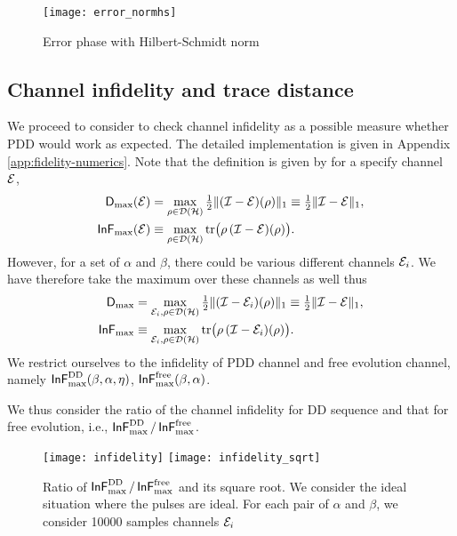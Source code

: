 \documentclass[aps,pra,reprint,superscriptaddress]{revtex4-2}
\begin{document}
\begin{figure}
    \centering
    \texttt{[image: error\_normhs]}
    \caption{Error phase with Hilbert-Schmidt norm} 
    \label{fig:pdd-region-check-norm}
\end{figure}

\subsection{Channel infidelity and trace distance}
We proceed to consider to check channel infidelity as a possible measure whether PDD would work as expected. The detailed implementation is given in Appendix \ref{app:fidelity-numerics}. Note that the definition is given by for a specify channel $\mathcal{E}$,
\begin{align}
\operatorname{\mathsf{D}}_{\max}(\mathcal{E}) &= \max_{\rho\in\mathcal{D}(\mathcal{H})} \tfrac{1}{2} \Vert { (\mathcal{I}-\mathcal{E}) (\rho)} \Vert_1 \equiv \tfrac{1}{2} \Vert { \mathcal{I}-\mathcal{E}} \Vert_1, \\
\operatorname{\mathsf{InF}}_{\max}(\mathcal{E}) &\equiv \max_{\rho\in\mathcal{D}(\mathcal{H})} \operatorname{tr}\bigl(\rho\, (\mathcal{I} -\mathcal{E})(\rho)\bigr).
\end{align}
However, for a set of $\alpha$ and $\beta$, there could be various different channels ${\mathcal{E}}_i$. We have therefore take the maximum over these channels as well thus  
\begin{align}
    \operatorname{\mathsf{D}}_{\max} &= \max_{{\mathcal{E}}_i, \rho\in\mathcal{D}(\mathcal{H})} \tfrac{1}{2} \Vert { (\mathcal{I}- {\mathcal{E}}_{i}) (\rho)} \Vert_1 \equiv \tfrac{1}{2} \Vert { \mathcal{I}-\mathcal{E}} \Vert_1, \\
    \operatorname{\mathsf{InF}}_{\max} &\equiv \max_{ {\mathcal{E}}_i,\rho\in\mathcal{D}(\mathcal{H})} \operatorname{tr}\bigl(\rho\, (\mathcal{I} -{\mathcal{E}}_{i})(\rho)\bigr).
\end{align}
We restrict ourselves to the infidelity of PDD channel and free evolution channel, namely $\operatorname{\mathsf{InF}}^{\rm DD}_{\rm max}(\beta, \alpha, \eta)$,  $\operatorname{\mathsf{InF}}^{\rm free}_{\rm max}(\beta, \alpha)$. 


We thus consider the ratio of the channel infidelity for DD sequence and that for free evolution, i.e., $\operatorname{\mathsf{InF}}^{\rm DD}_{\rm max} / \operatorname{\mathsf{InF}}^{\rm free}_{\rm max}$. 

\begin{figure}
    \centering
    \texttt{[image: infidelity]}
    \texttt{[image: infidelity\_sqrt]}
    \caption{Ratio of $\operatorname{\mathsf{InF}}^{\rm DD}_{\rm max} / \operatorname{\mathsf{InF}}^{\rm free}_{\rm max}$ and its square root. We consider the ideal situation where the pulses are ideal. For each pair of $\alpha$ and $\beta$, we consider 10000 samples channels ${\mathcal{E}}_i$} 
    \label{fig:pdd-region-fidelity}
\end{figure}
\end{document}

